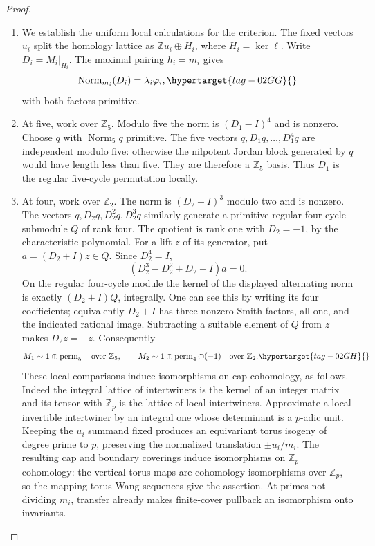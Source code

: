 \documentclass[11pt,a4paper]{article}
\numberwithin{equation}{section}
\theoremstyle{definition}
\begin{document}
\begin{proof}
\begin{enumerate}[label=\arabic*.]
\item We establish the uniform local calculations for the criterion.
The fixed vectors $u_i$ split the homology lattice as
$\mathbb Zu_i\oplus H_i$, where $H_i=\ker\ell$.
Write $D_i=M_i|_{H_i}$.
The maximal pairing $h_i=m_i$ gives
\begin{equation}
 \operatorname{Norm}_{m_i}(D_i)=\lambda_i\varphi_i ,
 \hypertarget{tag-02GG}{}\label{maps:eq:F.HC4}
\end{equation}
with both factors primitive.

\item At five, work over $\mathbb Z_5$.
Modulo five the norm is $(D_1-I)^4$ and is nonzero.
Choose $q$ with $\operatorname{Norm}_5q$ primitive.
The five vectors $q,D_1q,\ldots,D_1^4q$ are independent
modulo five: otherwise the nilpotent Jordan block generated
by $q$ would have length less than five.
They are therefore a $\mathbb Z_5$ basis.
Thus $D_1$ is the regular five-cycle permutation locally.

\item At four, work over $\mathbb Z_2$.
The norm is $(D_2-I)^3$ modulo two and is nonzero.
The vectors $q,D_2q,D_2^2q,D_2^3q$ similarly generate
a primitive regular four-cycle submodule $Q$ of rank four.
The quotient is rank one with $D_2=-1$, by the
characteristic polynomial.
For a lift $z$ of its generator, put $a=(D_2+I)z\in Q$.
Since $D_2^4=I$,
\[
 (D_2^3-D_2^2+D_2-I)a=0.
\]
On the regular four-cycle module the kernel of the
displayed alternating norm is exactly $(D_2+I)Q$,
integrally.  One can see this by writing its four
coefficients; equivalently $D_2+I$ has three nonzero
Smith factors, all one, and the indicated rational image.
Subtracting a suitable element of $Q$ from $z$ makes
$D_2z=-z$.
Consequently
\begin{equation}
 M_1\sim 1\oplus\operatorname{perm}_5\quad\text{over }\mathbb Z_5,
 \qquad
 M_2\sim1\oplus\operatorname{perm}_4\oplus(-1)
 \quad\text{over }\mathbb Z_2 .
 \hypertarget{tag-02GH}{}\label{maps:eq:F.HC5}
\end{equation}
These local comparisons induce isomorphisms on cap cohomology, as follows.
Indeed the integral lattice of intertwiners is the kernel
of an integer matrix and its tensor with $\mathbb Z_p$
is the lattice of local intertwiners.
Approximate a local invertible intertwiner by an integral
one whose determinant is a $p$-adic unit.
Keeping the $u_i$ summand fixed produces an equivariant
torus isogeny of degree prime to $p$, preserving the
normalized translation $\pm u_i/m_i$.
The resulting cap and boundary coverings induce
isomorphisms on $\mathbb Z_p$ cohomology: the vertical
torus maps are cohomology isomorphisms over $\mathbb Z_p$,
so the mapping-torus Wang sequences give the assertion.
At primes not dividing $m_i$, transfer already makes
finite-cover pullback an isomorphism onto invariants.


\end{enumerate}
\end{proof}
\end{document}
